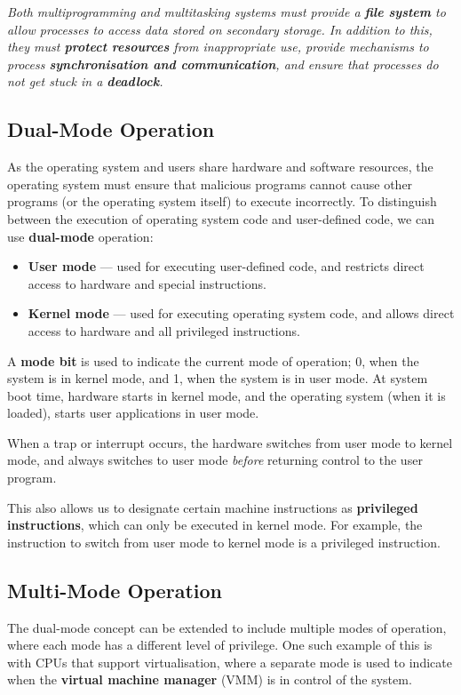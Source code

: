 \documentclass{article}
\begin{document}
\emph{Both multiprogramming and multitasking systems must provide a \textbf{file system} to allow processes to access data stored on secondary storage.
In addition to this, they must \textbf{protect resources} from inappropriate use, provide mechanisms to process \textbf{synchronisation and communication}, and
ensure that processes do not get stuck in a \textbf{deadlock}.}
\subsection{Dual-Mode Operation}
As the operating system and users share hardware and software resources, the operating system must ensure that
malicious programs cannot cause other programs (or the operating system itself) to execute incorrectly.
To distinguish between the execution of operating system code and user-defined code, we can use
\textbf{dual-mode} operation:
\begin{itemize}
    \item \textbf{User mode} --- used for executing user-defined code, and restricts direct access to hardware and special instructions.
    \item \textbf{Kernel mode} --- used for executing operating system code, and allows direct access to hardware and all privileged instructions.
\end{itemize}
A \textbf{mode bit} is used to indicate the current mode of operation; 0, when the system is in kernel mode, and 1, when the system is in user mode.
At system boot time, hardware starts in kernel mode, and the operating system (when it is loaded), starts user applications in user mode.

When a trap or interrupt occurs, the hardware switches from user mode to kernel mode, and always switches to user mode \textit{before}
returning control to the user program.

This also allows us to designate certain machine instructions as \textbf{privileged instructions}, which can only be executed in kernel mode.
For example, the instruction to switch from user mode to kernel mode is a privileged instruction.
\subsection{Multi-Mode Operation}
The dual-mode concept can be extended to include multiple modes of operation, where each mode has a different level of privilege.
One such example of this is with CPUs that support virtualisation, where a separate mode is used to indicate when the \textbf{virtual machine manager} (VMM)
is in control of the system.
\end{document}
